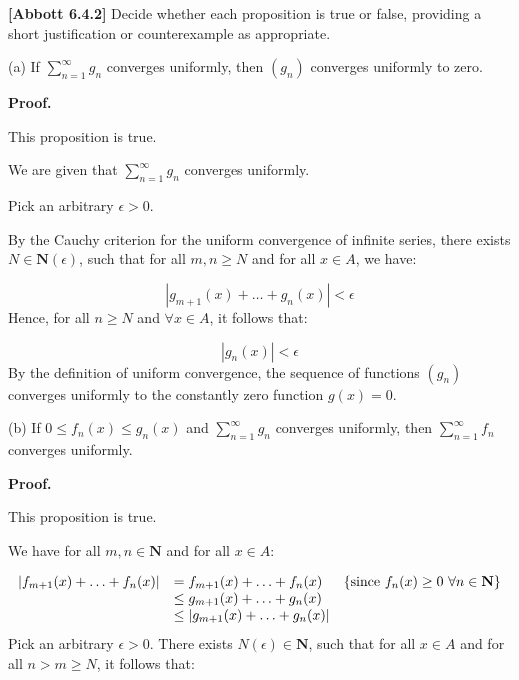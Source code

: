 \documentclass[10pt]{article}
\begin{document}
\textbf{[Abbott 6.4.2] }Decide whether each proposition is true or false, providing a short justification or counterexample as appropriate.



(a) If $\displaystyle \sum _{n=1}^{\infty } g_{n}$ converges uniformly, then $\displaystyle ( g_{n})$ converges uniformly to zero.



\textbf{Proof.}



This proposition is true.



We are given that $\displaystyle \sum _{n=1}^{\infty } g_{n}$ converges uniformly. 



Pick an arbitrary $\displaystyle \epsilon  >0$. 

 

By the Cauchy criterion for the uniform convergence of infinite series, there exists $\displaystyle N\in \mathbf{N}( \epsilon )$, such that for all $\displaystyle m,n\geq N$ and for all $\displaystyle x\in A$, we have:


\begin{equation*}
|g_{m+1}( x) +\dotsc +g_{n}( x) |< \epsilon 
\end{equation*}
Hence, for all $\displaystyle n\geq N$ and $\displaystyle \forall x\in A$, it follows that:


\begin{equation*}
|g_{n}( x) |< \epsilon 
\end{equation*}
By the definition of uniform convergence, the sequence of functions $\displaystyle ( g_{n})$ converges uniformly to the constantly zero function $\displaystyle g( x) =0$.



(b) If $\displaystyle 0\leq f_{n}( x) \leq g_{n}( x)$ and $\displaystyle \sum _{n=1}^{\infty } g_{n}$ converges uniformly, then $\displaystyle \sum _{n=1}^{\infty } f_{n}$ converges uniformly.



\textbf{Proof.} 



This proposition is true.



We have for all $\displaystyle m,n\in \mathbf{N}$ and for all $\displaystyle x\in A$:


\begin{equation*}
\begin{array}{ c l c }
|f_{m+1}( x) +\dotsc +f_{n}( x) | & =f_{m+1}( x) +\dotsc +f_{n}( x) & \left\{\text{since} \ f_{n}( x) \geq 0\ \forall n\in \mathbf{N}\right\}\\
 & \leq g_{m+1}( x) +\dotsc +g_{n}( x) & \\
 & \leq |g_{m+1}( x) +\dotsc +g_{n}( x) | & 
\end{array}
\end{equation*}
Pick an arbitrary $\displaystyle \epsilon  >0$. There exists $\displaystyle N( \epsilon ) \in \mathbf{N}$, such that for all $\displaystyle x\in A$ and for all $\displaystyle n >m\geq N$, it follows that:
\end{document}
